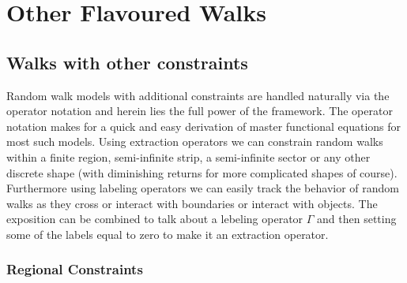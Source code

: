 \chapter{Other Flavoured Walks}
\label{sec:OtherWalks}

\section{Walks with other constraints}
\label{sec:Constraints}

Random walk models with additional constraints are handled naturally via the operator notation and herein lies the full power of the framework. The operator notation makes for a quick and easy derivation of master functional equations for most such models. Using extraction operators we can constrain random walks within a finite region, semi-infinite strip, a semi-infinite sector or any other discrete shape (with diminishing returns for more complicated shapes of course). Furthermore using labeling operators we can easily track the behavior of random walks as they cross or interact with boundaries or interact with objects. The exposition can be combined to talk about a lebeling operator $\Gamma$ and then setting some of the labels equal to zero to make it an extraction operator.

\subsection{Regional Constraints}

